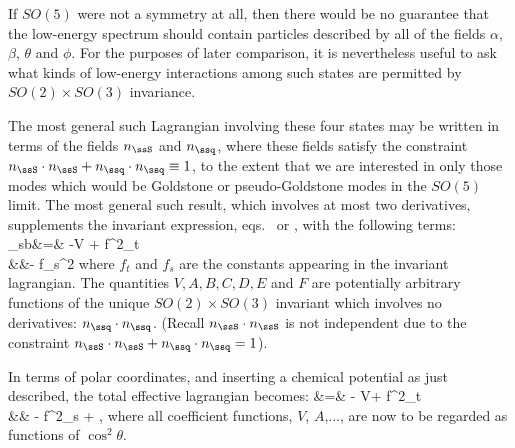 \documentclass[12pt,epsf]{report}
\def\nq{n_\ssq}
\def\ns{n_\ssS}
\def\sb{{\rm sb}}
\begin{document}
If $SO(5)$ were not a symmetry at all, then there would be
no guarantee that the low-energy spectrum should contain
particles described by all of the fields $\alpha$, $\beta$,
$\theta$ and 
$\phi$. For the purposes of later comparison, it is
nevertheless useful to ask what kinds of low-energy
interactions among such states are permitted by $SO(2)
\times SO(3)$ invariance.

The most general such Lagrangian involving these four
states may be written in terms of the fields $\ns$ and
$\nq$, where these fields satisfy the constraint $\ns\cdot
\ns + \nq \cdot \nq \equiv 1$, to the extent that we are
interested in only those modes which would be Goldstone or
pseudo-Goldstone modes in the $SO(5)$ limit. The most
general such result, which involves at most two
derivatives, supplements the invariant expression, 
eqs.~ or , with
the following terms:
%
\bg
\label{noninvform}
\Scl_\sb &=& -V + f^2_t \Bigl[ A 
\, \partial_t {\nq} \cdot  \partial_t {\nq} +
B \,\partial_t {\ns} \cdot
\partial_t {\ns} + C\,  (\nq \cdot \partial_t
\nq)^2 \Bigr] \nn\\
&&\qquad\qquad - f_s^2 \Bigl[ D \nabla_a {\nq}
\cdot \nabla_a {\nq} + E \nabla_a {\ns}
\cdot  \nabla_a {\ns} + F (\nq \cdot
\nabla_a \nq)^2 \Bigr] \nn
\nd
%
where $f_t$ and $f_s$ are the constants appearing in the
invariant lagrangian. The quantities $V, A, B, C, D, E$ and
$F$ are potentially arbitrary functions of the unique $SO(2)
\times SO(3)$ invariant which involves no derivatives: $\nq
\cdot \nq$. (Recall 
$\ns \cdot \ns$ is not independent due to the constraint
$\ns\cdot 
\ns + \nq \cdot \nq = 1$). 

In terms of polar coordinates, and inserting a chemical
potential as just described, the total effective lagrangian
becomes:
%
\bg
\label{kintermangles}
\Scl &=& - V+  {f^2_t }
 \nn\\
&& \qquad \qquad - {f^2_s }  + \cdots,\nn
\nd
%
where all coefficient functions, $V$, $A$,...\etc, are now
to be regarded as functions of $\cos^2\theta$.
\end{document}
